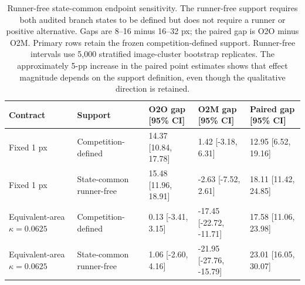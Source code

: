 \begin{table}[ht]
\centering
\scriptsize
\caption{Runner-free state-common endpoint sensitivity. The runner-free support requires both audited branch states to be defined but does not require a runner or positive alternative. Gaps are 8--16 minus 16--32 px; the paired gap is O2O minus O2M. Primary rows retain the frozen competition-defined support. Runner-free intervals use 5,000 stratified image-cluster bootstrap replicates. The approximately 5-pp increase in the paired point estimates shows that effect magnitude depends on the support definition, even though the qualitative direction is retained.}
\label{tab:runner_free_sensitivity}
\begin{tabularx}{\textwidth}{@{}llXXX@{}}
\toprule
Contract & Support & O2O gap [95\% CI] & O2M gap [95\% CI] & Paired gap [95\% CI] \\
\midrule
Fixed 1 px & Competition-defined & 14.37 [10.84, 17.78] & 1.42 [-3.18, 6.31] & 12.95 [6.52, 19.16] \\
Fixed 1 px & State-common runner-free & 15.48 [11.96, 18.91] & -2.63 [-7.52, 2.61] & 18.11 [11.42, 24.85] \\
Equivalent-area $\kappa=0.0625$ & Competition-defined & 0.13 [-3.41, 3.15] & -17.45 [-22.72, -11.71] & 17.58 [11.06, 23.98] \\
Equivalent-area $\kappa=0.0625$ & State-common runner-free & 1.06 [-2.60, 4.16] & -21.95 [-27.76, -15.79] & 23.01 [16.05, 30.07] \\
\bottomrule
\end{tabularx}
\end{table}
